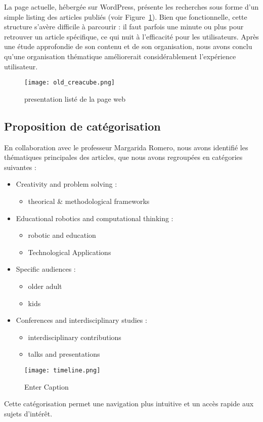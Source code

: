 \documentclass{article}
\begin{document}
La page actuelle, hébergée sur WordPress, présente les recherches sous forme d’un simple listing des articles publiés (voir Figure~\ref{fig:old_creacube}). Bien que fonctionnelle, cette structure s’avère difficile à parcourir : il faut parfois une minute ou plus pour retrouver un article spécifique, ce qui nuit à l’efficacité pour les utilisateurs. Après une étude approfondie de son contenu et de son organisation, nous avons conclu qu'une organisation thématique améliorerait considérablement l’expérience utilisateur.

\begin{figure}[H]
    \centering
    \texttt{[image: old\_creacube.png]}
    \caption{presentation listé de la page web}
    \label{fig:old_creacube}
\end{figure}

\subsection{Proposition de catégorisation}

En collaboration avec le professeur Margarida Romero, nous avons identifié les thématiques principales des articles, que nous avons regroupées en catégories suivantes :
\begin{itemize}
    \item Creativity and problem solving :
    \begin{itemize}[label=\textbullet]
        \item theorical \& methodological frameworks
    \end{itemize}
    \item Educational robotics and computational thinking :
    \begin{itemize}[label=\textbullet]
        \item robotic and education
        \item Technological Applications
    \end{itemize}
    \item Specific audiences :
    \begin{itemize}[label=\textbullet]
        \item older adult
        \item kids
    \end{itemize}
    \item Conferences and interdisciplinary studies :
    \begin{itemize}[label=\textbullet]
        \item interdisciplinary contributions
        \item talks and presentations
    \end{itemize}
\end{itemize}
\begin{figure}
    \centering
    \texttt{[image: timeline.png]}
    \caption{Enter Caption}
    \label{fig:enter-label}
\end{figure}
Cette catégorisation permet une navigation plus intuitive et un accès rapide aux sujets d’intérêt.
\end{document}
